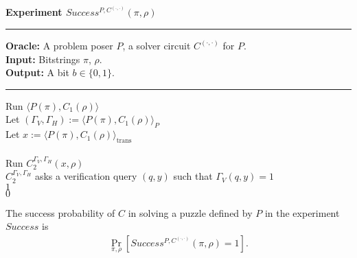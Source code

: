 \begin{codeblock}
  \textbf{Experiment $Success^{P, C^{(\cdot, \cdot)}}(\pi, \rho) $}
  \medskip
  \hrule
  \medskip
  \textbf{Oracle:} A problem poser $P$, a solver circuit $C^{(\cdot,\cdot)}$ for $P$.\\
  \textbf{Input:}  Bitstrings $\pi$, $\rho$.\\
  \textbf{Output:} A bit $b \in \{0,1\}$.
  \medskip\hrule\medskip
  Run $\langle P(\pi), C_1(\rho) \rangle$ \\
  \IndI Let $(\Gamma_V, \Gamma_H) := \langle P(\pi), C_1(\rho) \rangle_{P}$ \\
  \IndI Let $x := \langle P(\pi), C_1(\rho) \rangle_{\text{trans}}$ \\ \\
  Run $C_2^{\Gamma_V,\Gamma_H}(x, \rho)$ \\
  \IndI \If $C_2^{\Gamma_V, \Gamma_H}$ asks a verification query $(q, y)$ such that $\Gamma_V(q, y) = 1$ \then \\
  \IndII \return $1$ \\
  \return $0$ \\
\end{codeblock}
%
The success probability of $C$ in solving a puzzle defined by $P$ in the experiment $Success$ is
\begin{align}
 \underset{\pi, \rho}{\Pr}[Success^{P,C^{(\cdot, \cdot)}}(\pi, \rho) = 1].
\end{align}
%
